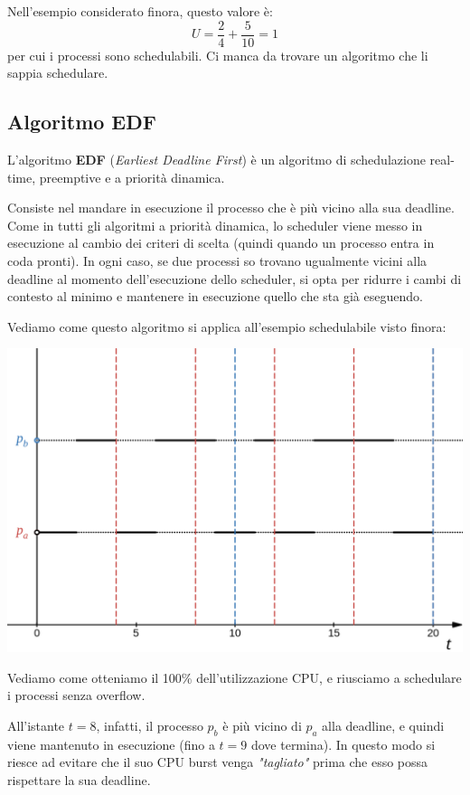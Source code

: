 \documentclass[a4paper,11pt]{article}
\begin{document}
Nell'esempio considerato finora, questo valore è:
$$
U = \frac{2}{4} + \frac{5}{10} = 1
$$
per cui i processi sono schedulabili. Ci manca da trovare un algoritmo che li sappia schedulare. 

\subsection{Algoritmo EDF}
L'algoritmo \textbf{EDF} (\textit{Earliest Deadline First}) è un algoritmo di schedulazione real-time, preemptive e a priorità dinamica.

Consiste nel mandare in esecuzione il processo che è più vicino alla sua deadline.
Come in tutti gli algoritmi a priorità dinamica, lo scheduler viene messo in esecuzione al cambio dei criteri di scelta (quindi quando un processo entra in coda pronti). In ogni caso, se due processi so trovano ugualmente vicini alla deadline al momento dell'esecuzione dello scheduler, si opta per ridurre i cambi di contesto al minimo e mantenere in esecuzione quello che sta già eseguendo.

\par\smallskip

Vediamo come questo algoritmo si applica all'esempio schedulabile visto finora:
\begin{center}
	\includegraphics[scale=0.3]{../figures/edf.png}
\end{center}

Vediamo come otteniamo il 100\% dell'utilizzazione CPU, e riusciamo a schedulare i processi senza overflow.

All'istante $t = 8$, infatti, il processo $p_b$ è più vicino di $p_a$ alla deadline, e quindi viene mantenuto in esecuzione (fino a $t = 9$ dove termina).
In questo modo si riesce ad evitare che il suo CPU burst venga \textit{"tagliato"} prima che esso possa rispettare la sua deadline.
\end{document}
